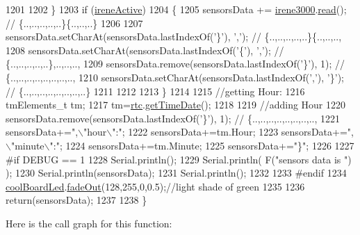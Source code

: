 \begin{DoxyCode}
1201 
1202     \}
1203     \textcolor{keywordflow}{if} (\hyperlink{class_cool_board_a9c3f7ac625481ee2ae802a25d97a4ae0}{ireneActive})
1204     \{
1205         sensorsData += \hyperlink{class_cool_board_ad103718ce316006c4695b8eb312eaf11}{irene3000}.\hyperlink{class_irene3000_a852a170feea994ea1df01c6b245b5d9a}{read}(); \textcolor{comment}{// \{..,..,..,..,..\}\{..,..,..\}}
1206 
1207         sensorsData.setCharAt(sensorsData.lastIndexOf(\textcolor{charliteral}{'\}'}), \textcolor{charliteral}{','}); \textcolor{comment}{// \{..,..,..,..,..\}\{..,..,..,}
1208         sensorsData.setCharAt(sensorsData.lastIndexOf(\textcolor{charliteral}{'\{'}), \textcolor{charliteral}{','}); \textcolor{comment}{// \{..,..,..,..,..\},..,..,..,}
1209         sensorsData.remove(sensorsData.lastIndexOf(\textcolor{charliteral}{'\}'}), 1); \textcolor{comment}{// \{..,..,..,..,..,..,..,..,}
1210         sensorsData.setCharAt(sensorsData.lastIndexOf(\textcolor{charliteral}{','}), \textcolor{charliteral}{'\}'}); \textcolor{comment}{// \{..,..,..,..,..,..,..,..\}      }
1211         
1212         
1213     \}
1214 
1215     \textcolor{comment}{//getting Hour:}
1216     tmElements\_t tm;
1217     tm=\hyperlink{class_cool_board_a50d2a6716879d64a85f3c6b44ad63275}{rtc}.\hyperlink{class_cool_time_a7a7501c5ca77dd1248bea704c44f986c}{getTimeDate}();
1218     
1219     \textcolor{comment}{//adding Hour}
1220     sensorsData.remove(sensorsData.lastIndexOf(\textcolor{charliteral}{'\}'}), 1); \textcolor{comment}{// \{..,..,..,..,..,..,..,..,   }
1221     sensorsData+=\textcolor{stringliteral}{",\(\backslash\)"hour\(\backslash\)":"};  
1222     sensorsData+=tm.Hour;
1223     sensorsData+=\textcolor{stringliteral}{",\(\backslash\)"minute\(\backslash\)":"};
1224     sensorsData+=tm.Minute;
1225     sensorsData+=\textcolor{stringliteral}{"\}"};
1226     
1227 \textcolor{preprocessor}{#if DEBUG == 1}
1228     Serial.println();
1229     Serial.println( F(\textcolor{stringliteral}{"sensors data is "}) );
1230     Serial.println(sensorsData);
1231     Serial.println();
1232 
1233 \textcolor{preprocessor}{#endif}
1234     \hyperlink{class_cool_board_a1b1d3c684a5baa56b08486e192fd8e97}{coolBoardLed}.\hyperlink{class_cool_board_led_a93d545679237e8cc858324367149775c}{fadeOut}(128,255,0,0.5);\textcolor{comment}{//light shade of green}
1235 
1236     \textcolor{keywordflow}{return}(sensorsData);
1237 
1238 \}
\end{DoxyCode}
Here is the call graph for this function\+:\nopagebreak
